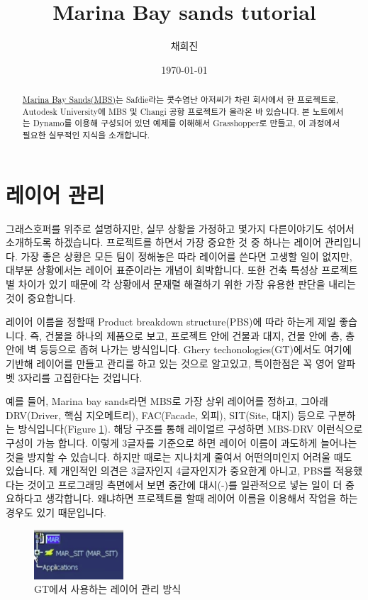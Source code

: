 \documentclass[11pt]{article}
\title{Marina Bay sands tutorial}
\author{채희진}
\date{\today}
\begin{document}
    

\maketitle
\thispagestyle{empty}
\clearpage

\doclicenseThis
\thispagestyle{empty}
\clearpage

\tableofcontents
\thispagestyle{empty}
\clearpage


\begin{abstract}
   \href{https://www.safdiearchitects.com/projects/marina-bay-sands-integrated-resort}{Marina Bay Sands(MBS)}는 Safdie라는 콧수염난 아저씨가 차린 회사에서 한 프로젝트로, Autodesk University에 MBS 및 Changi 공항 프로젝트가 올라온 바 있습니다. 
   본 노트에서는 Dynamo를 이용해 구성되어 있던 예제를 이해해서 Grasshopper로 만들고, 이 과정에서 필요한 실무적인 지식을 소개합니다. 
\end{abstract}

\section{레이어 관리}
그래스호퍼를 위주로 설명하지만, 실무 상황을 가정하고 몇가지 다른이야기도 섞어서 소개하도록 하겠습니다. 프로젝트를 하면서 가장 중요한 것 중 하나는 레이어 관리입니다.
 가장 좋은 상황은 모든 팀이 정해놓은 따라 레이어를 쓴다면 고생할 일이 없지만, 대부분 상황에서는 레이어 표준이라는 개념이 희박합니다. 또한 건축 특성상 프로젝트별 차이가 있기 때문에
 각 상황에서 문재렬 해결하기 위한 가장 유용한 판단을 내리는 것이 중요합니다.

 레이어 이름을 정할때 Product breakdown structure(PBS)에 따라 하는게 제일 좋습니다. 즉, 건물을 하나의 제품으로 보고, 프로젝트 안에 건물과 대지, 건물 안에 층, 층 안에 벽 등등으로 좁혀 나가는 방식입니다.
 Ghery techonologies(GT)에서도 여기에 기반해 레이어를 만들고 관리를 하고 있는 것으로 알고있고, 특이한점은 꼭 영어 알파벳 3자리를 고집한다는 것입니다. 

 예를 들어, Marina bay sands라면 MBS로 가장 상위 레이어를 정하고, 그아래 DRV(Driver, 핵심 지오메트리), FAC(Facade, 외피), SIT(Site, 대지) 등으로 구분하는 방식입니다(Figure \ref{fig:ghery_example}). 해당 구조를 통해 레이얼르 구성하면 
 MBS-DRV 이런식으로 구성이 가능 합니다. 이렇게 3글자를 기준으로 하면 레이어 이름이 과도하게 늘어나는 것을 방지할 수 있습니다. 하지만 때로는 지나치게 줄여서 어떤의미인지 어려울 때도 있습니다.
 제 개인적인 의견은 3글자인지 4글자인지가 중요한게 아니고, PBS를 적용했다는 것이고 프로그래밍 측면에서 보면 중간에 대시(-)를 일관적으로 넣는 일이 더 중요하다고 생각합니다.
 왜냐하면 프로젝트를 할때 레이어 이름을 이용해서 작업을 하는 경우도 있기 때문입니다.
 \begin{figure}[H]
    \centering
    \includegraphics[width=.3\textwidth]{./img/ghery_example}
    \caption[Caption for LOF]{GT에서 사용하는 레이어 관리 방식\footnotemark}
    \label{fig:ghery_example}
 \end{figure}
\end{document}
